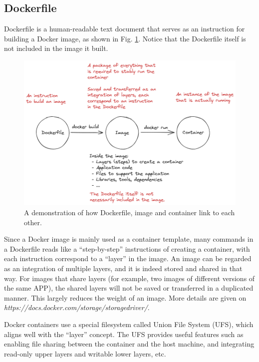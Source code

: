 \subsection{Dockerfile}

Dockerfile is a human-readable text document that serves as an instruction for building a Docker image, as shown in Fig. \ref{ch:vac:fig:dockerfiletoimage}. Notice that the Dockerfile itself is not included in the image it built.

\begin{figure}
	\centering
	\includegraphics[width=350pt]{chapters/ch-virtualization-and-containerization/figures/dockerfiletoimage.png}
	\caption{A demonstration of how Dockerfile, image and container link to each other.} \label{ch:vac:fig:dockerfiletoimage}
\end{figure}

Since a Docker image is mainly used as a container template, many commands in a Dockerfile reads like a ``step-by-step'' instructions of creating a container, with each instruction correspond to a ``layer'' in the image. An image can be regarded as an integration of multiple layers, and it is indeed stored and shared in that way. For images that share layers (for example, two images of different versions of the same APP), the shared layers will not be saved or transferred in a duplicated manner. This largely reduces the weight of an image. More details are given on \textit{https://docs.docker.com/storage/storagedriver/}.

Docker containers use a special filesystem called Union File System (UFS), which aligns well with the ``layer'' concept. The UFS provides useful features such as enabling file sharing between the container and the host machine, and integrating read-only upper layers and writable lower layers, etc.

